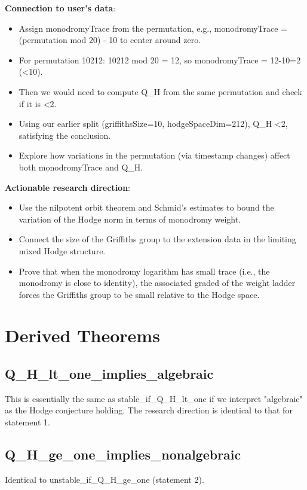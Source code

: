 \documentclass[11pt]{article}
\begin{document}
\textbf{Connection to user's data}:
\begin{itemize}
\item Assign monodromyTrace from the permutation, e.g., monodromyTrace = (permutation mod 20) - 10 to center around zero.
\item For permutation 10212: 10212 mod 20 = 12, so monodromyTrace = 12-10=2 (<10).
\item Then we would need to compute Q\_H from the same permutation and check if it is <2.
\item Using our earlier split (griffithsSize=10, hodgeSpaceDim=212), Q\_H <2, satisfying the conclusion.
\item Explore how variations in the permutation (via timestamp changes) affect both monodromyTrace and Q\_H.
\end{itemize}

\textbf{Actionable research direction}:
\begin{itemize}
\item Use the nilpotent orbit theorem and Schmid's estimates to bound the variation of the Hodge norm in terms of monodromy weight.
\item Connect the size of the Griffiths group to the extension data in the limiting mixed Hodge structure.
\item Prove that when the monodromy logarithm has small trace (i.e., the monodromy is close to identity), the associated graded of the weight ladder forces the Griffiths group to be small relative to the Hodge space.
\end{itemize}

\section{Derived Theorems}

\subsection{Q\_H\_lt\_one\_implies\_algebraic}
This is essentially the same as stable\_if\_Q\_H\_lt\_one if we interpret "algebraic" as the Hodge conjecture holding. The research direction is identical to that for statement 1.

\subsection{Q\_H\_ge\_one\_implies\_nonalgebraic}
Identical to unstable\_if\_Q\_H\_ge\_one (statement 2).
\end{document}
